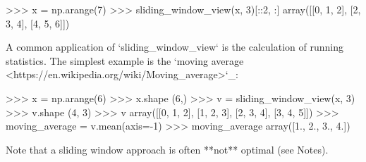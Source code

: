\begin{DoxyVerb}
>>> x = np.arange(7)
>>> sliding_window_view(x, 3)[::2, :]
array([[0, 1, 2],
       [2, 3, 4],
       [4, 5, 6]])

A common application of `sliding_window_view` is the calculation of running
statistics. The simplest example is the
`moving average <https://en.wikipedia.org/wiki/Moving_average>`_:

>>> x = np.arange(6)
>>> x.shape
(6,)
>>> v = sliding_window_view(x, 3)
>>> v.shape
(4, 3)
>>> v
array([[0, 1, 2],
       [1, 2, 3],
       [2, 3, 4],
       [3, 4, 5]])
>>> moving_average = v.mean(axis=-1)
>>> moving_average
array([1., 2., 3., 4.])

Note that a sliding window approach is often **not** optimal (see Notes).
\end{DoxyVerb}
 